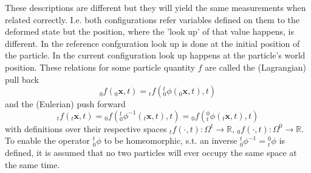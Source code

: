 \documentclass[m,times]{cgMA}
\begin{document}
These descriptions are different but they will yield the same measurements when related correctly. I.e. both configurations refer variables defined on them to the deformed state but the position, where the 'look up' of that value happens, is different. In the reference confguration look up is done at the initial position of the particle. In the current configuration look up happens at the particle's world position. These relations for some particle quantity $f$ are called the (Lagrangian) pull back
\begin{equation}
  _0f(_0\boldsymbol{x},t)= {_tf}({^t_0}\phi(_0\boldsymbol{x},t),t)
\end{equation}
and the (Eulerian) push forward
\begin{equation}\label{eq:push_forward}
  _tf(_t\boldsymbol{x},t) =  {_0f}({^t_0}\phi^{-1}(_t\boldsymbol{x},t),t) = {_0f}({_t^0}\phi(_t\boldsymbol{x},t),t)
\end{equation}
with definitions over their respective spaces $_tf ( \cdot , t ) : \Omega ^ {  { t } } \rightarrow \mathbb { R }$, $_0f ( \cdot , t ) : \Omega ^ {   { 0 } } \rightarrow \mathbb { R }$.  To enable the operator ${^t_0}\phi$ to be homeomorphic, s.t. an inverse ${^t_0}\phi^{-1} = {_t^0}\phi$ is defined, it is assumed that no two particles will ever occupy the same space at the same time.
\end{document}
